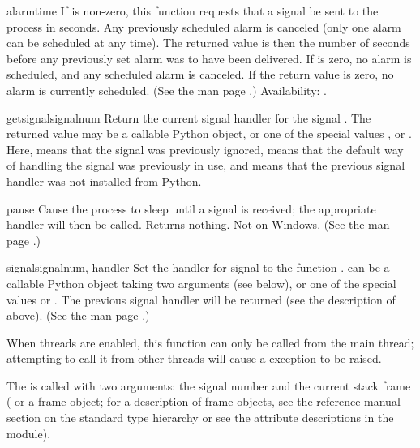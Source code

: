 \begin{funcdesc}{alarm}{time}
  If  is non-zero, this function requests that a
   signal be sent to the process in  seconds.
  Any previously scheduled alarm is canceled (only one alarm can
  be scheduled at any time).  The returned value is then the number of
  seconds before any previously set alarm was to have been delivered.
  If  is zero, no alarm is scheduled, and any scheduled
  alarm is canceled.  If the return value
  is zero, no alarm is currently scheduled.  (See the \UNIX{} man page
  .)
  Availability: \UNIX.
\end{funcdesc}

\begin{funcdesc}{getsignal}{signalnum}
  Return the current signal handler for the signal .
  The returned value may be a callable Python object, or one of the
  special values ,  or
  .  Here,  means that the
  signal was previously ignored,  means that the
  default way of handling the signal was previously in use, and
   means that the previous signal handler was not installed
  from Python.
\end{funcdesc}

\begin{funcdesc}{pause}{}
  Cause the process to sleep until a signal is received; the
  appropriate handler will then be called.  Returns nothing.  Not on
  Windows. (See the \UNIX{} man page .)
\end{funcdesc}

\begin{funcdesc}{signal}{signalnum, handler}
  Set the handler for signal  to the function
  .   can be a callable Python object
  taking two arguments (see below), or
  one of the special values  or
  .  The previous signal handler will be returned
  (see the description of  above).  (See the
  \UNIX{} man page .)

  When threads are enabled, this function can only be called from the
  main thread; attempting to call it from other threads will cause a
   exception to be raised.

  The  is called with two arguments: the signal number
  and the current stack frame ( or a frame object;
  for a description of frame objects, see the reference manual section
  on the standard type hierarchy or see the attribute descriptions in
  the  module).
\end{funcdesc}

